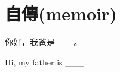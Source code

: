 \documentclass[class=NCU_thesis, crop=false]{standalone}
\begin{document}
\chapter{自傳(memoir)}

你好，我爸是\_\_\_。

Hi, my father is \_\_\_.
\end{document}
